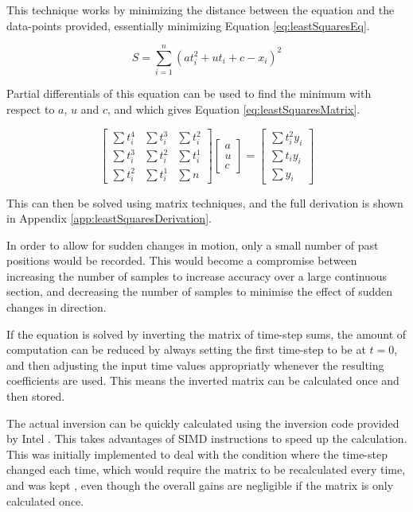 \documentclass[10pt]{article}
\begin{document}
This technique works by minimizing the distance between the equation and the
data-points provided, essentially minimizing Equation \ref{eq:leastSquaresEq}.

\begin{equation}
  S = \sum_{i=1}^n (a t_i^2+ u t_i + c - x_i)^2 
  \label{eq:leastSquaresEq}
\end{equation}

Partial differentials of this equation can be used to find the minimum with
respect to $a$, $u$ and $c$, and which gives Equation
\ref{eq:leastSquaresMatrix}.

\begin{equation}
  \left[
   \begin{matrix}
    \sum t_i^4 & \sum t_i^3 & \sum t_i^2 \\
    \sum t_i^3 & \sum t_i^2 & \sum t_i^1 \\
    \sum t_i^2 & \sum t_i^1 & \sum n
   \end{matrix}
  \right]
  \left[
   \begin{matrix}
    a \\
    u \\
    c
   \end{matrix}
  \right]
  =
  \left[
   \begin{matrix}
    \sum t_i^2 y_i \\
    \sum t_i y_i \\
    \sum y_i
   \end{matrix}
  \right]
  \label{eq:leastSquaresMatrix}
\end{equation}

This can then be solved using matrix techniques, and the full derivation is
shown in Appendix \ref{app:leastSquaresDerivation}.

In order to allow for sudden changes in motion, only a small number of past
positions would be recorded.  This would become a compromise between increasing
the number of samples to increase accuracy over a large continuous section, and
decreasing the number of samples to minimise the effect of sudden changes in
direction.

If the equation is solved by inverting the matrix of time-step sums, the amount
of computation can be reduced by always setting the first time-step to be at
$t=0$, and then adjusting the input time values appropriatly whenever the
resulting coefficients are used.  This means the inverted matrix can be
calculated once and then stored.

The actual inversion can be quickly calculated using the inversion code provided
by Intel \cite{intelMatrixInverse}.  This takes advantages of SIMD
instructions to speed up the calculation.  This was initially implemented to
deal with the condition where the time-step changed each time, which would
require the matrix to be recalculated every time, and was kept , even though the
overall gains are negligible if the matrix is only calculated once.
\end{document}
